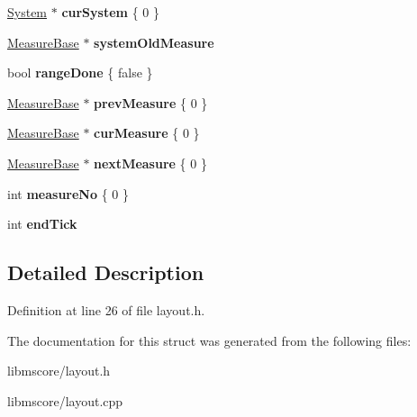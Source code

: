 \begin{DoxyCompactItemize}
\item 
\mbox{\label{struct_ms_1_1_layout_context_a5fb0640e02f8bfd3f1a383e7a4052250}} 
\hyperlink{class_ms_1_1_system}{System} $\ast$ {\bfseries cur\+System} \{ 0 \}
\item 
\mbox{\label{struct_ms_1_1_layout_context_a7e8b4ba56f18cb041803394a6cf5128a}} 
\hyperlink{class_ms_1_1_measure_base}{Measure\+Base} $\ast$ {\bfseries system\+Old\+Measure}
\item 
\mbox{\label{struct_ms_1_1_layout_context_a024756cf326cb9c76731aab5f4b152a6}} 
bool {\bfseries range\+Done} \{ false \}
\item 
\mbox{\label{struct_ms_1_1_layout_context_a5a9584b81bbc6358dbdf54a80de73bbd}} 
\hyperlink{class_ms_1_1_measure_base}{Measure\+Base} $\ast$ {\bfseries prev\+Measure} \{ 0 \}
\item 
\mbox{\label{struct_ms_1_1_layout_context_ab556c492bf4ca535ac980e0f557374a1}} 
\hyperlink{class_ms_1_1_measure_base}{Measure\+Base} $\ast$ {\bfseries cur\+Measure} \{ 0 \}
\item 
\mbox{\label{struct_ms_1_1_layout_context_a028a9cb06e39b4da8ac2171855033f61}} 
\hyperlink{class_ms_1_1_measure_base}{Measure\+Base} $\ast$ {\bfseries next\+Measure} \{ 0 \}
\item 
\mbox{\label{struct_ms_1_1_layout_context_a83eb91a089cdd2cd25d1f18c5b607310}} 
int {\bfseries measure\+No} \{ 0 \}
\item 
\mbox{\label{struct_ms_1_1_layout_context_a528e5a880f98cf2e101eada6c2e88c6c}} 
int {\bfseries end\+Tick}
\end{DoxyCompactItemize}


\subsection{Detailed Description}


Definition at line 26 of file layout.\+h.



The documentation for this struct was generated from the following files\+:\begin{DoxyCompactItemize}
\item 
libmscore/layout.\+h\item 
libmscore/layout.\+cpp\end{DoxyCompactItemize}
